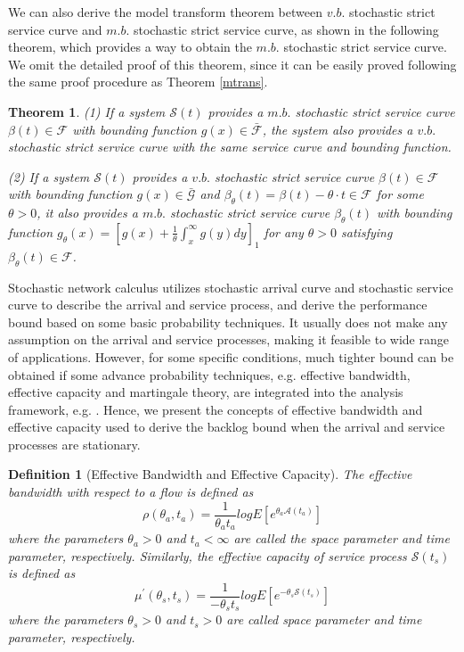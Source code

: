 \documentclass[12pt]{article}
\newtheorem{theorem}{Theorem}
\newtheorem{definition}{Definition}
\begin{document}
We can also derive the model transform theorem between $v.b.$ stochastic strict service curve and $m.b.$ stochastic strict service curve, as shown in the following theorem, which provides a way to obtain the $m.b.$ stochastic strict service curve. We omit the detailed proof of this theorem, since it can be easily proved following the same proof procedure as Theorem \ref{mtrans}.
\begin{theorem}\label{mtrans2}
(1) If a system $\mathcal{S}(t)$ provides a $m.b.$ stochastic strict service curve $\beta(t)\in\mathcal{F}$ with bounding function $g(x)\in\bar{\mathcal{F}}$, the system also provides a $v.b.$ stochastic strict service curve with the same service curve and bounding function.

(2) If a system $\mathcal{S}(t)$ provides a $v.b.$ stochastic strict service curve $\beta(t)\in\mathcal{F}$ with bounding function $g(x)\in\bar{\mathcal{G}}$ and $\beta_{\theta}(t)=\beta(t)-\theta\cdot t\in\mathcal{F}$ for some $\theta>0$, it also provides a $m.b.$ stochastic strict service curve $\beta_{\theta}(t)$ with bounding function $g_{\theta}(x)=[g(x)+\frac{1}{\theta}\int_x^\infty g(y)dy]_1$ for any $\theta>0$ satisfying $\beta_{\theta}(t)\in\mathcal{F}$.
\end{theorem}

Stochastic network calculus utilizes stochastic arrival curve and stochastic service curve to describe the arrival and service process, and derive the performance bound based on some basic probability techniques. It usually does not make any assumption on the arrival and service processes, making it feasible to wide range of applications. However, for some specific conditions, much tighter bound can be obtained if some advance probability techniques, e.g. effective bandwidth, effective capacity and martingale theory, are integrated into the analysis framework, e.g. \cite{Li2007Network,5984844,jiang2009network,Ciucu2007Network}. Hence, we present the concepts of effective bandwidth \cite{Kelly1996Note} and effective capacity \cite{Wu2003Effective} used to derive the backlog bound when the arrival and service processes are stationary.
\begin{definition}[Effective Bandwidth and Effective Capacity]
The effective bandwidth with respect to a flow is defined as
$$\rho(\theta_a,t_a)=\frac{1}{\theta_a t_a}log E[e^{\theta_a \mathcal{A}(t_a)}]$$
where the parameters $\theta_a>0$ and $t_a<\infty$ are called the space parameter and time parameter, respectively. Similarly, the effective capacity of service process $\mathcal{S}(t_s)$ is defined as
$$\mu^\prime(\theta_s,t_s)=\frac{1}{-\theta_s t_s}log E[e^{-\theta_s \mathcal{S}(t_s)}]$$
where the parameters $\theta_s>0$ and $t_s>0$ are called space parameter and time parameter, respectively.
\end{definition}
\end{document}
